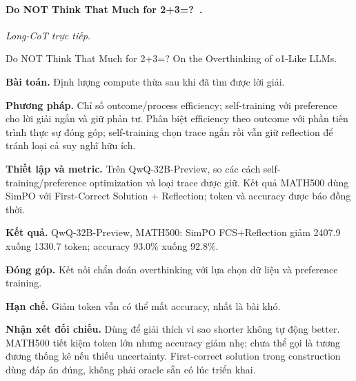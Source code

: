 \begin{samepage}
\paragraph{Do NOT Think That Much for 2+3=?~\cite{rra3_chen_overthinking}.}
\emph{Long-CoT trực tiếp.}\par
{\raggedright\noindent\small Do NOT Think That Much for 2+3=? On the Overthinking of o1-Like LLMs.\par}
\noindent\textbf{Bài toán.} Định lượng compute thừa sau khi đã tìm được lời giải.\par
\end{samepage}
\noindent\textbf{Phương pháp.} Chỉ số outcome/process efficiency; self-training với preference cho lời giải ngắn và giữ phản tư. Phân biệt efficiency theo outcome với phần tiến trình thực sự đóng góp; self-training chọn trace ngắn rồi vẫn giữ reflection để tránh loại cả suy nghĩ hữu ích.\par
\noindent\textbf{Thiết lập và metric.} Trên QwQ-32B-Preview, so các cách self-training/preference optimization và loại trace được giữ. Kết quả MATH500 dùng SimPO với First-Correct Solution + Reflection; token và accuracy được báo đồng thời.\par
\noindent\textbf{Kết quả.} QwQ-32B-Preview, MATH500: SimPO FCS+Reflection giảm 2407.9 xuống 1330.7 token; accuracy 93.0\% xuống 92.8\%.\par
\noindent\textbf{Đóng góp.} Kết nối chẩn đoán overthinking với lựa chọn dữ liệu và preference training.\par
\noindent\textbf{Hạn chế.} Giảm token vẫn có thể mất accuracy, nhất là bài khó.\par
\begin{samepage}
\noindent\textbf{Nhận xét đối chiếu.} Dùng để giải thích vì sao shorter không tự động better. MATH500 tiết kiệm token lớn nhưng accuracy giảm nhẹ; chưa thể gọi là tương đương thống kê nếu thiếu uncertainty. First-correct solution trong construction dùng đáp án đúng, không phải oracle sẵn có lúc triển khai.\par
{}
\end{samepage}

